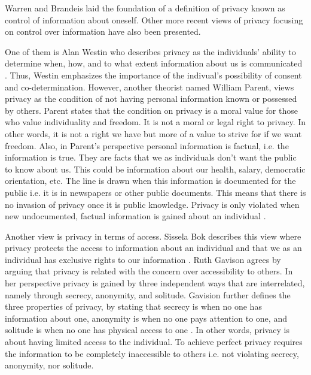 Warren and Brandeis laid the foundation of a definition of privacy known as control of information about oneself. Other more recent views of privacy focusing on control over information have also been presented.

One of them is Alan Westin who describes privacy as the individuals' ability to determine when, how, and to what extent information about us is communicated \cite{westin:1969}. Thus, Westin emphasizes the importance of the indivual's possibility of consent and co-determination. 
However, another theorist named William Parent, views privacy as the condition of not having personal information known or possessed by others. Parent states that the condition on privacy is a moral value for those who value individuality and freedom. It is not a moral or legal right to privacy. In other words, it is not a right we have but more of a value to strive for if we want freedom. Also, in Parent's perspective personal information is factual, i.e. the information is true. They are facts that we as individuals don't want the public to know about us. This could be information about our health, salary, democratic orientation, etc. The line is drawn when this information is documented for the public i.e. it is in newspapers or other public documents. This means that there is no invasion of privacy once it is public knowledge. Privacy is only violated when new undocumented, factual information is gained about an individual \cite{parent:1983}. 

Another view is privacy in terms of access. Sissela Bok describes this view where privacy protects the access to information about an individual and that we as an individual has exclusive rights to our information \cite{bok:1982}. Ruth Gavison agrees by arguing that privacy is related with the concern over accessibility to others. In her perspective privacy is gained by three independent ways that are interrelated, namely through secrecy, anonymity, and solitude. Gavision further defines the three properties of privacy, by stating that secrecy is when no one has information about one, anonymity is when no one pays attention to one, and solitude is when no one has physical access to one \cite{gavison:1980}.  
In other words, privacy is about having limited access to the individual. To achieve perfect privacy requires the information to be completely inaccessible to others i.e. not violating secrecy, anonymity, nor solitude. 

